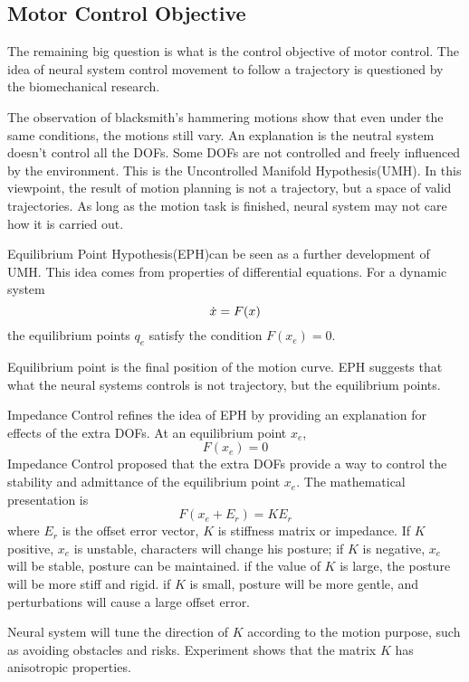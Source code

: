 \subsection{Motor Control Objective}
The remaining big question is what is the control objective of motor control.
The idea of neural system control movement to follow a trajectory is questioned by the biomechanical research.

The observation of blacksmith's hammering motions show that even under the same conditions, the motions still vary. 
An explanation is the neutral system doesn't control all the DOFs. 
Some DOFs are not controlled and freely influenced by the environment. 
This is the Uncontrolled Manifold Hypothesis(UMH)\citep{latash2008neurophysiological}. 
In this viewpoint, the result of motion planning is not a trajectory, but a space of valid trajectories. As long as the motion task is finished, neural system may not care how it is carried out.



Equilibrium Point Hypothesis(EPH)\citep{Feldman1986}can be seen as a further development of UMH. 
This idea comes from properties of differential equations. 
For a dynamic system
\[
\dot{x}=F(x)
\]
the equilibrium points $q_{e}$ satisfy the condition $F(x_{e})=0$.

Equilibrium point is the final position of the motion curve.
EPH suggests that what the neural systems controls is not trajectory, but the equilibrium points.



Impedance Control \citep{hogan1985ica} refines the idea of EPH by providing an explanation for effects of the extra DOFs. 
At an equilibrium point $x_{e}$,
\[
F(x_{e})=0 
\]
Impedance Control proposed that the extra DOFs provide a way to control the stability and admittance of the equilibrium point $x_{e}$. 
The mathematical presentation is
\begin{equation}
F(x_{e}+E_r)=KE_r
\end{equation}
where $E_r$ is the offset error vector, $K$ is stiffness matrix or impedance.
If $K$ positive, $x_{e}$ is unstable, characters will change his posture;
if $K$ is negative, $x_{e}$ will be stable, posture can be maintained.
if the value of $K$ is large, the posture will be more stiff and rigid.
if $K$ is small, posture will be more gentle, and perturbations will cause a large offset error.

Neural system will tune the direction of $K$ according to the motion purpose, such as avoiding obstacles and risks. 
Experiment \citep{Franklin2007} shows that the matrix $K$ has anisotropic properties.

